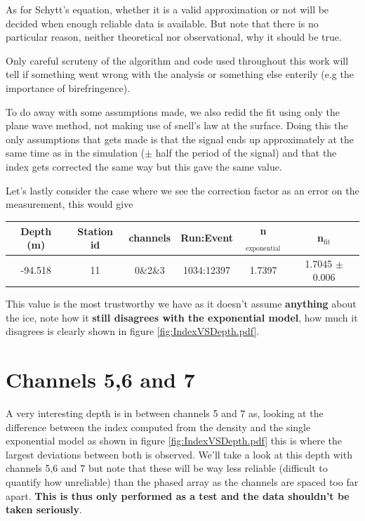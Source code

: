As for Schytt's equation, whether it is a valid approximation or not will be
decided when enough reliable data is available. But note that there is no particular
reason, neither theoretical nor observational, why it should be true.

Only careful scruteny of the algorithm and code  used throughout this work will tell
if something went wrong with the analysis or something else enterily (e.g the importance of birefringence).

To do away with some assumptions made, we also redid the fit using only the
plane wave method, not making use of snell's law at the surface. Doing this the
only assumptions that gets made is that the signal ends up approximately at the
same time as in the simulation ($\pm$ half the period of the signal) and that
the index gets corrected the same way but this gave the same value.

Let's lastly consider the case where we see the correction factor as an error on the measurement, this would give
\begin{center}
\begin{tabular}{||c c c c c c||}
 \hline
 Depth (m) & Station id & channels & Run:Event & n$_\text{exponential}$ & n$_\text{fit}$\\ [0.5ex]
 \hline\hline
 -94.518 & 11 & 0\&2\&3 & 1034:12397 & 1.7397 & 1.7045 $\pm$ 0.006 \\
 \hline
\end{tabular}
\end{center}
This value is the most trustworthy we have as it doesn't assume \textbf{anything} about the
ice, note how it \textbf{still disagrees with the exponential model}, how much it disagrees
is clearly shown in figure \ref{fig:IndexVSDepth.pdf}.
\section{Channels 5,6 and 7}
A very interesting depth is in between channels 5 and 7 as, looking at the
difference between the index computed from the density and the single
exponential model as shown in figure \ref{fig:IndexVSDepth.pdf} this is where
the largest deviations between both is observed. We'll take a look at this
depth with channels 5,6 and 7 but note  that these will be way less reliable
(difficult to quantify how unreliable) than the phased array as the channels
are spaced too far apart. \textbf{This is thus only performed as a test and
the data shouldn't be taken seriously}.

